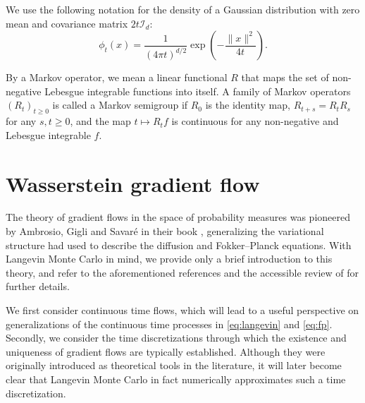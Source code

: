 \documentclass[final,12pt]{colt2018}
\begin{document}
We use the following notation for the density of a Gaussian distribution with zero mean and covariance matrix $2t\mathcal{I}_d$:
\begin{equation}\label{eq:gaussian_kernel}
\phi_t(x) = \frac{1}{(4\pi t)^{d/2}}\exp\left(- \frac{\|x\|^2}{4t}\right).
\end{equation}

By a Markov operator, we mean a linear functional $R$ that maps the set of non-negative Lebesgue integrable functions into itself. A family of Markov operators $(R_t)_{t\geq0}$ is called a Markov semigroup if $R_0$ is the identity map, $R_{t+s} = R_tR_s$ for any $s,t\geq 0$, and the map $t\mapsto R_t f$ is continuous for any non-negative and Lebesgue integrable $f$.

\section{Wasserstein gradient flow} \label{sec:wasserstein_gradient_flow}
The theory of gradient flows in the space of probability measures was pioneered by Ambrosio, Gigli and Savar\'e in their book \citet{ambrosio2005},  generalizing the variational structure \citet{jordan1998variational} had used to describe the diffusion and Fokker--Planck equations. With Langevin Monte Carlo in mind, we provide only a brief introduction to this theory, and refer to the aforementioned references and the accessible review of \citet{santambrogio2016euclidean} for further details.

We first consider continuous time flows, which will lead to a useful perspective on generalizations of the continuous time processes in \eqref{eq:langevin} and \eqref{eq:fp}. Secondly, we consider the time discretizations through which the existence and uniqueness of gradient flows are typically established. Although they were originally introduced as theoretical tools in the literature, it will later become clear that Langevin Monte Carlo in fact numerically approximates such a time discretization.
\end{document}
